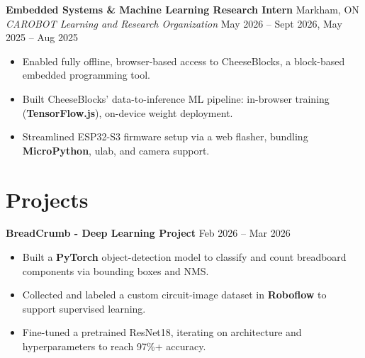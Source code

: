 \documentclass[10pt,letterpaper]{article}
\begin{document}
\vspace{0.25em}
\textbf{Embedded Systems \& Machine Learning Research Intern} \hfill
Markham, ON \\
\textit{CAROBOT Learning and Research Organization} \hfill 
May 2026 -- Sept 2026, May 2025 -- Aug 2025 \\
\begin{itemize}
    \item Enabled fully offline, browser-based access to CheeseBlocks, a block-based embedded programming tool.
    \item Built CheeseBlocks' data-to-inference ML pipeline: in-browser training (\textbf{TensorFlow.js}), on-device weight deployment.
    \item Streamlined ESP32-S3 firmware setup via a web flasher, bundling \textbf{MicroPython}, ulab, and camera support.
\end{itemize}




\section{Projects}


\textbf{BreadCrumb - Deep Learning Project} \hfill Feb 2026 -- Mar 2026 \\
\begin{itemize}
    \item Built a \textbf{PyTorch} object-detection model to classify and count breadboard components via bounding boxes and NMS.
    \item Collected and labeled a custom circuit-image dataset in \textbf{Roboflow} to support supervised learning.
    \item Fine-tuned a pretrained ResNet18, iterating on architecture and hyperparameters to reach 97\%+ accuracy.
\end{itemize}
\end{document}
